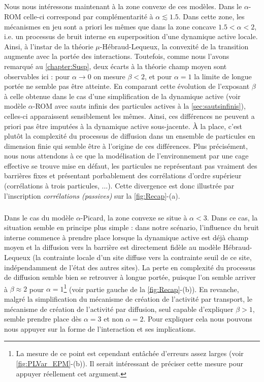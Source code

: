 \subparagraph{}Nous nous intéressons maintenant à la zone convexe de ces modèles. Dans le $\alpha$-ROM celle-ci correspond par complémentarité à $\alpha\lesssim 1.5$. Dans cette zone, les mécanismes en jeu sont a priori les mêmes que dans la zone concave $1.5 < \alpha < 2$, i.e. un processus de bruit interne en superposition d'une dynamique active locale. Ainsi, à l'instar de la théorie $\mu$-Hébraud-Lequeux, la convexité de la transition augmente avec la portée des interactions. Toutefois, comme nous l'avons remarqué au \autoref{chapter:Susp}, deux écarts à la théorie champ moyen sont observables ici : pour $\alpha \rightarrow 0$ on mesure $\beta < 2$, et pour $\alpha = 1$ la limite de longue portée ne semble pas être atteinte. En comparant cette évolution de l'exposant $\beta$ à celle obtenue dans le cas d'une simplification de la dynamique active (voir modèle $\alpha$-ROM avec sauts infinis des particules actives à la \autoref{sec:sautsinfinis}), celles-ci apparaissent sensiblement les mêmes. Ainsi, ces différences ne peuvent a priori pas être imputées à la dynamique active sous-jacente. \`A la place, c'est plutôt la complexité du processus de diffusion dans un ensemble de particules en dimension finie qui semble être à l'origine de ces différences. Plus précisément, nous nous attendons à ce que la modélisation de l'environnement par une cage effective se trouve mise en défaut, les particules ne représentant pas vraiment des barrières fixes et présentant porbablement des corrélations d'ordre supérieur (corrélations à trois particules, ...). Cette divergence est donc illustrée par l'inscription \textit{corrélations (passives)} sur la \autoref{fig:Recap}-(a).

\subparagraph{}Dans le cas du modèle $\alpha$-Picard, la zone convexe se situe à $\alpha < 3$. Dans ce cas, la situation semble en principe plus simple : dans notre scénario, l'influence du bruit interne commence à prendre place lorsque la dynamique active est déjà champ moyen et la diffusion vers la barrière est directement fidèle au modèle Hébraud-Lequeux (la contrainte locale d'un site diffuse vers la contrainte seuil de ce site, indépendamment de l'état des autres sites). La perte en complexité du processus de diffusion semble bien se retrouver à longue portée, puisque l'on semble arriver à $\beta \approx 2$ pour $\alpha = 1$\footnote{La mesure de ce point est cependant entâchée d'erreurs assez larges (voir \autoref{fig:PLVar_EPM}-(b)). Il serait intéressant de préciser cette mesure pour appuyer réellement cet argument.} (voir partie gauche de la \autoref{fig:Recap}-(b)). En revanche, malgré la simplification du mécanisme de création de l'activité par transport, le mécanisme de création de l'activité par diffusion, seul capable d'expliquer $\beta >1$, semble prendre place dès $\alpha=3$ et non $\alpha = 2$. Pour expliquer cela nous pouvons nous appuyer sur la forme de l'interaction et ses implications.

